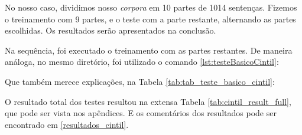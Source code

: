 No nosso caso, dividimos nosso \textit{corpora} em 10 partes de 1014 sentenças. Fizemos o treinamento com 9 partes, e o teste com a parte restante, alternando as partes escolhidas. Os resultados serão apresentados na conclusão.

Na sequência, foi executado o treinamento com as partes restantes. De maneira análoga, no mesmo diretório, foi utilizado o comando \ref{lst:testeBasicoCintil}:

\begin{center}

\end{center}

Que também merece explicações, na Tabela \ref{tab:tab_teste_basico_cintil}:
\begin{center}

\end{center}

O resultado total dos testes resultou na extensa Tabela \ref{tab:cintil_result_full}, que pode ser vista nos apêndices. E os comentários dos resultados pode ser encontrado em \ref{resultados_cintil}.